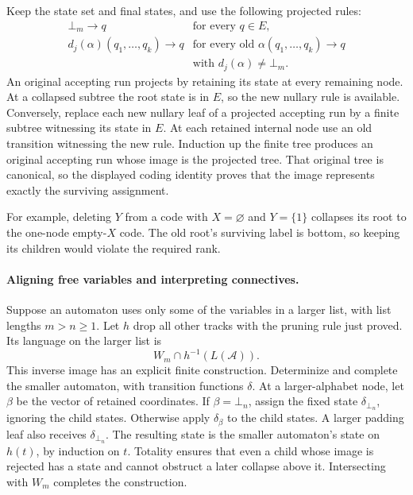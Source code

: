 Keep the state set and final states, and use the following projected rules:
\[
\begin{array}{ll}
 \bot_m\to q&\text{for every }q\in E,\\
 d_j(\alpha)(q_1,\ldots,q_k)\to q
   &\text{for every old }\alpha(q_1,\ldots,q_k)\to q\\
   &\text{with }d_j(\alpha)\ne\bot_m.
\end{array}
\]
An original accepting run projects by retaining its state at every
remaining node.  At a collapsed subtree the root state is in \(E\),
so the new nullary rule is available.
Conversely, replace each new nullary leaf of a projected accepting
run by a finite subtree witnessing its state in \(E\).
At each retained internal node use an old transition witnessing
the new rule.  Induction up the finite tree produces an original
accepting run whose image is the projected tree.
That original tree is canonical, so the displayed coding identity
proves that the image represents exactly the surviving assignment.

For example, deleting \(Y\) from a code with \(X=\varnothing\)
and \(Y=\{1\}\) collapses its root to the one-node empty-\(X\) code.
The old root's surviving label is bottom, so keeping its children
would violate the required rank.

\paragraph{Aligning free variables and interpreting connectives.}
\label{sec:p09-wsks-logical-induction}
Suppose an automaton uses only some of the variables in a larger list,
with list lengths \(m>n\geq1\).
Let \(h\) drop all other tracks with the pruning rule just proved.
Its language on the larger list is
\[
 W_m\cap h^{-1}(L(\mathcal A)).
\]
This inverse image has an explicit finite construction.
Determinize and complete the smaller automaton, with transition
functions \(\delta\).  At a larger-alphabet node, let \(\beta\)
be the vector of retained coordinates.
If \(\beta=\bot_n\), assign the fixed state \(\delta_{\bot_n}\),
ignoring the child states.  Otherwise apply \(\delta_\beta\) to
the child states.  A larger padding leaf also receives
\(\delta_{\bot_n}\).
The resulting state is the smaller automaton's state on \(h(t)\),
by induction on \(t\).
Totality ensures that even a child whose image is rejected has a
state and cannot obstruct a later collapse above it.
Intersecting with \(W_m\) completes the construction.

